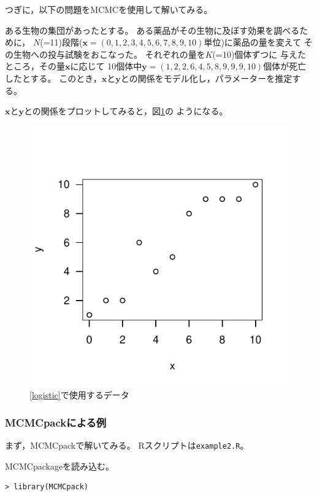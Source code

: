 \documentclass[11pt,uplatex]{jsarticle}
\begin{document}
つぎに，以下の問題をMCMCを使用して解いてみる。
\vspace{1zw}

\hspace{18mm}
\begin{minipage}{100mm}
\begin{breakbox}
\noindent
ある生物の集団があったとする。
ある薬品がその生物に及ぼす効果を調べるために，
$N$(=11)段階($\bm{x} = (0, 1, 2, 3, 4, 5, 6, 7, 8, 9, 10)$単位)に薬品の量を変えて
その生物への投与試験をおこなった。
それぞれの量を$K$(=10)個体ずつに
与えたところ，その量$\bm{x}$に応じて
10個体中$\bm{y} = (1, 2, 2, 6, 4, 5, 8, 9, 9, 9, 10)$個体が死亡したとする。
このとき，$\bm{x}$と$\bm{y}$との関係をモデル化し，パラメーターを推定する。
\end{breakbox}
\end{minipage}
\vspace{1zw}

$\bm{x}$と$\bm{y}$との関係をプロットしてみると，図\ref{example2_plot}の
ようになる。

\begin{figure}[htbp]
  \begin{center}
    \includegraphics[bb=0 0 240 240, clip, width=160 bp]{example2.pdf}
  \end{center}
  \caption{\ref{logistic}で使用するデータ}
  \label{example2_plot}
\end{figure}


\subsubsection{MCMCpackによる例}

まず，\textsf{MCMCpack}で解いてみる。
\textsf{R}スクリプトは\texttt{example2.R}。

\textsf{MCMCpackage}を読み込む。
\begin{lstlisting}
> library(MCMCpack)
\end{lstlisting}
\end{document}
